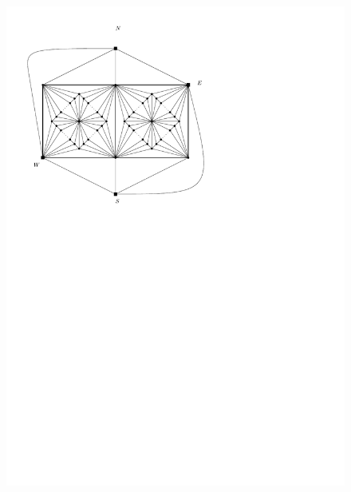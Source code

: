   \begin{figure}[h]
    \centering
    \includegraphics[scale=1]{fixExtension/img/manymanybase}
    \caption{}
    \label{fig:fix:manymany0}
  \end{figure}




